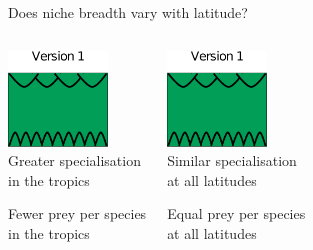 \documentclass{beamer}
\begin{document}
  \begin{frame}{Does niche breadth vary with latitude?}
    \begin{columns}
    \column{.5in}
    \column{1.75in}
      \begin{center}
      \includegraphics[height=1in]{Figures/version1.eps}\\
      \vspace{.5cm}
      Greater specialisation\\in the tropics

      \vspace{.25cm}
      Fewer prey per species\\in the tropics

      \end{center}
    \column{.5in}
    \column{1.75in}
      \begin{center}
      \includegraphics[height=1in]{Figures/version1.eps}\\
      \vspace{.5cm}
      Similar specialisation\\at all latitudes

      \vspace{.25cm}
      Equal prey per species\\at all latitudes

      \end{center}
    \column{.5in}
    \end{columns}

  \end{frame}
\end{document}
